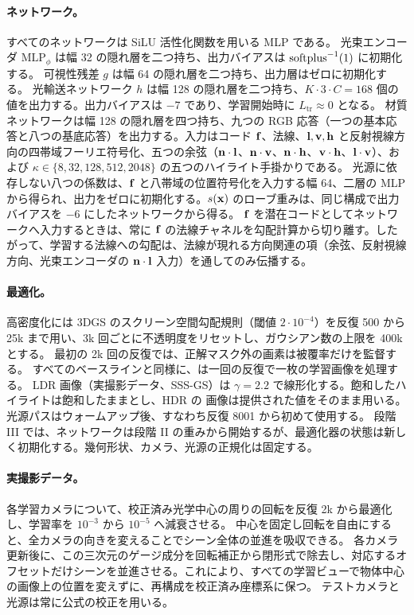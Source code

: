 \documentclass[10pt,twocolumn,letterpaper]{article}
\begin{document}
\paragraph{ネットワーク。}
すべてのネットワークは SiLU 活性化関数を用いる MLP である。
光束エンコーダ $\mathrm{MLP}_\phi$ は幅 32 の隠れ層を二つ持ち、出力バイアスは $\operatorname{softplus}^{-1}(1)$ に初期化する。
可視性残差 $g$ は幅 64 の隠れ層を二つ持ち、出力層はゼロに初期化する。
光輸送ネットワーク $h$ は幅 128 の隠れ層を二つ持ち、$K\cdot3\cdot C=168$ 個の値を出力する。出力バイアスは $-7$ であり、学習開始時に $L_{\mathrm{tr}}\approx0$ となる。
材質ネットワークは幅 128 の隠れ層を四つ持ち、九つの RGB 応答（一つの基本応答と八つの基底応答）を出力する。入力はコード $\mathbf{f}$、法線、$\mathbf{l},\mathbf{v},\mathbf{h}$ と反射視線方向の四帯域フーリエ符号化、五つの余弦（$\mathbf{n}\cdot\mathbf{l}$、$\mathbf{n}\cdot\mathbf{v}$、$\mathbf{n}\cdot\mathbf{h}$、$\mathbf{v}\cdot\mathbf{h}$、$\mathbf{l}\cdot\mathbf{v}$）、および $\kappa\in\{8,32,128,512,2048\}$ の五つのハイライト手掛かりである。
光源に依存しない八つの係数は、$\mathbf{f}$ と八帯域の位置符号化を入力する幅 64、二層の MLP から得られ、出力をゼロに初期化する。$s(\mathbf{x})$ のローブ重みは、同じ構成で出力バイアスを $-6$ にしたネットワークから得る。
$\mathbf{f}$ を潜在コードとしてネットワークへ入力するときは、常に $\mathbf{f}$ の法線チャネルを勾配計算から切り離す。したがって、学習する法線への勾配は、法線が現れる方向関連の項（余弦、反射視線方向、光束エンコーダの $\mathbf{n}\cdot\mathbf{l}$ 入力）を通してのみ伝播する。

\paragraph{最適化。}
高密度化には 3DGS のスクリーン空間勾配規則（閾値 $2\cdot10^{-4}$）を反復 500 から 25k まで用い、3k 回ごとに不透明度をリセットし、ガウシアン数の上限を 400k とする。
最初の 2k 回の反復では、正解マスク外の画素は被覆率だけを監督する。
すべてのベースラインと同様に、\ours は一回の反復で一枚の学習画像を処理する。
LDR 画像（実撮影データ、SSS-GS）は $\gamma=2.2$ で線形化する。飽和したハイライトは飽和したままとし、HDR の \gsthree 画像は提供された値をそのまま用いる。
光源パスはウォームアップ後、すなわち反復 8001 から初めて使用する。
段階 III では、ネットワークは段階 II の重みから開始するが、最適化器の状態は新しく初期化する。幾何形状、カメラ、光源の正規化は固定する。

\paragraph{実撮影データ。}
各学習カメラについて、校正済み光学中心の周りの回転を反復 2k から最適化し、学習率を $10^{-3}$ から $10^{-5}$ へ減衰させる。
中心を固定し回転を自由にすると、全カメラの向きを変えることでシーン全体の並進を吸収できる。
各カメラ更新後に、この三次元のゲージ成分を回転補正から閉形式で除去し、対応するオフセットだけシーンを並進させる。これにより、すべての学習ビューで物体中心の画像上の位置を変えずに、再構成を校正済み座標系に保つ。
テストカメラと光源は常に公式の校正を用いる。
\end{document}
